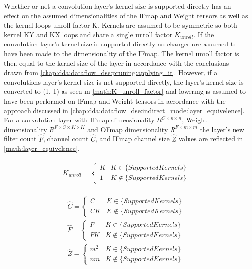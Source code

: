Whether or not a convolution layer's kernel size is supported directly has an effect on the assumed
dimensionalities of the IFmap and Weight tensors as well as the kernel loops
unroll factor K. Kernels are assumed to be symmetric so both kernel KY and KX
loops and share a single unroll factor $K_{unroll}$. If the convolution layer's
kernel size is supported directly no changes are assumed to have been made to
the dimensionality of the IFmap. The kernel unroll factor is then equal to the
kernel size of the layer in accordance with the conclusions drawn from
\autoref{chap:dda:dataflow_dse:pruning:applying_it}. However, if
a convolutions layer's kernel size is not supported directly, the layer's kernel
size is converted to (1, 1) as seen in \autoref{math:K_unroll_factor} and lowering
is assumed to have been performed on IFmap and Weight tensors in accordance with
the approach discussed in \autoref{chap:dda:dataflow_dse:indirect_mode:layer_equivelence}. For a convolution
layer with IFmap dimensionality $R^{C\times n\times n}$, Weight dimensionality
$R^{F\times C\times K\times K}$ and OFmap dimensionality $R^{F\times m\times m}$
the layer's new filter count $\hat{F}$, channel count $\hat{C}$, and IFmap
channel size $\hat{Z}$ values are reflected in \autoref{math:layer_equivelence}. 

\begin{align}
    \begin{gathered}
        K_{unroll} = \begin{cases} K & K \in \{SupportedKernels\}\\1 &K \notin \{SupportedKernels\}\end{cases}
            \end{gathered}
    \label{math:K_unroll_factor}
\end{align}

\begin{align}
    \begin{gathered}
        \hat{C} = \begin{cases} C &  K \in \{SupportedKernels\}\\ CK & K \notin \{SupportedKernels\}\end{cases} \\
        \hat{F} = \begin{cases} F &  K \in \{SupportedKernels\}\\ FK & K \notin \{SupportedKernels\}\end{cases} \\
        \hat{Z} = \begin{cases} m^2 &  K \in \{SupportedKernels\}\\ nm & K \notin \{SupportedKernels\}\end{cases}
            \end{gathered}
    \label{math:layer_equivelence}
\end{align}

